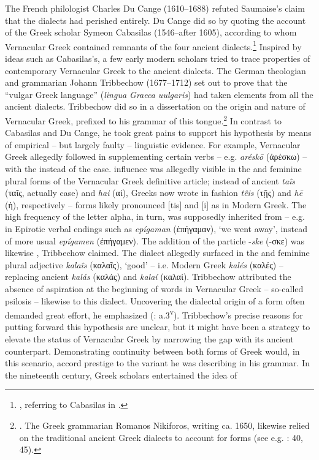 The French philologist Charles Du Cange (1610–1688) refuted Saumaise’s claim that the dialects had perished entirely. Du Cange did so by quoting the account of the Greek scholar Symeon Cabasilas (1546–after 1605), according to whom Vernacular Greek contained remnants of the four ancient dialects.\footnote{ \citet[viii]{Du1688}, referring to Cabasilas in \citet[462]{Crusius1584}.} Inspired by ideas such as Cabasilas’s, a few early modern scholars tried to trace properties of contemporary Vernacular Greek to the ancient dialects. The German theologian and grammarian Johann Tribbechow (1677–1712) set out to prove that the “vulgar Greek language” (\textit{lingua Graeca uulgaris}) had taken elements from all the ancient dialects. Tribbechow did so in a dissertation on the origin and nature of Vernacular Greek, prefixed to his grammar of this tongue.\footnote{\citet[a.3\textsc{\textsuperscript{r}}]{Tribbechow1705}. The Greek grammarian Romanos Nikiforos, writing ca. 1650, likewise relied on the traditional ancient Greek dialects to account for  forms (see e.g. \citealt{Nikiforos1908}: 40, 45).} In contrast to Cabasilas and Du Cange, he took great pains to support his hypothesis by means of empirical – but largely faulty – linguistic evidence. For example, Vernacular Greek allegedly followed  in supplementing certain verbs – e.g. \textit{aréskō} (ἀρέσκω) – with the  instead of the  case.  influence was allegedly visible in the  and  feminine plural forms of the Vernacular Greek definitive article; instead of ancient \textit{taîs} (ταῖς, actually  case) and \textit{hai} (αἱ), Greeks now wrote in  fashion \textit{têis} (τῇς) and \textit{hē} (ἡ), respectively – forms likely pronounced [tis] and [i] as in Modern Greek. The high frequency of the letter alpha, in turn, was supposedly inherited from  – e.g. in  Epirotic verbal endings such as \textit{epígaman} (ἐπήγαμαν), ‘we went away’, instead of more usual \textit{epígamen} (ἐπήγαμεν). The addition of the particle -\textit{ske} (-σκε) was likewise , Tribbechow claimed. The  dialect allegedly surfaced in the  and  feminine plural adjective \textit{kalaîs} (καλαῖς), ‘good’ – i.e. Modern Greek \textit{kalés} (καλές) – replacing ancient \textit{kalás} (καλάς) and \textit{kalaí} (καλαί). Tribbechow attributed the absence of aspiration at the beginning of words in Vernacular Greek – so-called psilosis – likewise to this dialect. Uncovering the dialectal origin of a  form often demanded great effort, he emphasized (\citealt{Tribbechow1705}: a.3\textsc{\textsuperscript{v}}). Tribbechow’s precise reasons for putting forward this hypothesis are unclear, but it might have been a strategy to elevate the status of Vernacular Greek by narrowing the gap with its ancient counterpart. Demonstrating continuity between both forms of Greek would, in this scenario, accord prestige to the  variant he was describing in his grammar. In the nineteenth century, Greek scholars entertained the idea of 